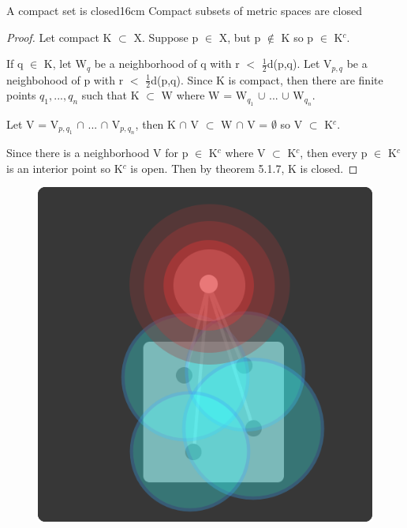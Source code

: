 	\newpage



	\begin{wtheorem}{A compact set is closed}{16cm}
		Compact subsets of metric spaces are closed
	\end{wtheorem}
	
	\begin{proof}
		Let compact K $\subset$ X.
		Suppose p $\in$ X, but p $\not \in$ K so p $\in$ K$^c$.

		If q $\in$ K, let W$_q$ be a neighborhood of q with
		r $<$ $\frac{1}{2}$d(p,q).
		Let V$_{p,q}$ be a neighbohood of p with r $<$ $\frac{1}{2}$d(p,q).
		Since K is compact, then there are finite points $q_1, ... , q_n$
		such that K $\subset$ W where W = W$_{q_1}$ $\cup$ ... $\cup$ W$_{q_n}$.

		Let V = V$_{p,q_1}$ $\cap$ ... $\cap$ V$_{p,q_n}$, then
		K $\cap$ V $\subset$ W $\cap$ V = $\emptyset$ so V $\subset$ K$^c$.

		Since there is a neighborhood V for p $\in$ K$^c$ where V $\subset$ K$^c$,
		then every p $\in$ K$^c$ is an interior point so K$^c$ is open.
		Then by {\color{red} theorem 5.1.7}, K is closed.	
	\end{proof}



	\begin{figure}[h]
		\centering
		\includegraphics[scale=0.35]{Images/6.3.4.png}
	\end{figure}



